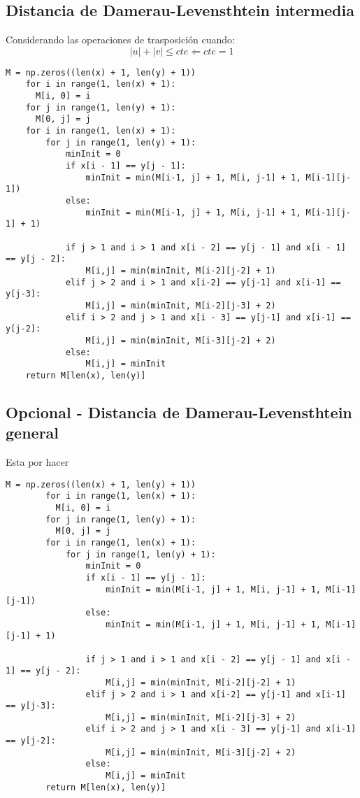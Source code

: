 \vfill
\subsection{Distancia de Damerau-Levensthtein intermedia}
Considerando las operaciones de trasposición cuando:
\begin{equation}
    |u| + |v| 	\leqslant cte \Leftarrow cte = 1
\end{equation}
\begin{lstlisting}[label={list:first},caption=Damerau-Levensthtein intermedio]
    M = np.zeros((len(x) + 1, len(y) + 1))
    for i in range(1, len(x) + 1):
      M[i, 0] = i
    for j in range(1, len(y) + 1):
      M[0, j] = j
    for i in range(1, len(x) + 1):
        for j in range(1, len(y) + 1):
            minInit = 0
            if x[i - 1] == y[j - 1]:
                minInit = min(M[i-1, j] + 1, M[i, j-1] + 1, M[i-1][j-1])
            else:
                minInit = min(M[i-1, j] + 1, M[i, j-1] + 1, M[i-1][j-1] + 1)

            if j > 1 and i > 1 and x[i - 2] == y[j - 1] and x[i - 1] == y[j - 2]:
                M[i,j] = min(minInit, M[i-2][j-2] + 1)
            elif j > 2 and i > 1 and x[i-2] == y[j-1] and x[i-1] == y[j-3]:
                M[i,j] = min(minInit, M[i-2][j-3] + 2)
            elif i > 2 and j > 1 and x[i - 3] == y[j-1] and x[i-1] == y[j-2]:
                M[i,j] = min(minInit, M[i-3][j-2] + 2)
            else:
                M[i,j] = minInit
    return M[len(x), len(y)]
\end{lstlisting}

\subsection{Opcional - Distancia de Damerau-Levensthtein general}
    Esta por hacer
    \begin{lstlisting}[label={list:first},caption=Damerau-Levensthtein general]
        M = np.zeros((len(x) + 1, len(y) + 1))
        for i in range(1, len(x) + 1):
          M[i, 0] = i
        for j in range(1, len(y) + 1):
          M[0, j] = j
        for i in range(1, len(x) + 1):
            for j in range(1, len(y) + 1):
                minInit = 0
                if x[i - 1] == y[j - 1]:
                    minInit = min(M[i-1, j] + 1, M[i, j-1] + 1, M[i-1][j-1])
                else:
                    minInit = min(M[i-1, j] + 1, M[i, j-1] + 1, M[i-1][j-1] + 1)
    
                if j > 1 and i > 1 and x[i - 2] == y[j - 1] and x[i - 1] == y[j - 2]:
                    M[i,j] = min(minInit, M[i-2][j-2] + 1)
                elif j > 2 and i > 1 and x[i-2] == y[j-1] and x[i-1] == y[j-3]:
                    M[i,j] = min(minInit, M[i-2][j-3] + 2)
                elif i > 2 and j > 1 and x[i - 3] == y[j-1] and x[i-1] == y[j-2]:
                    M[i,j] = min(minInit, M[i-3][j-2] + 2)
                else:
                    M[i,j] = minInit
        return M[len(x), len(y)]
\end{lstlisting}



\newpage